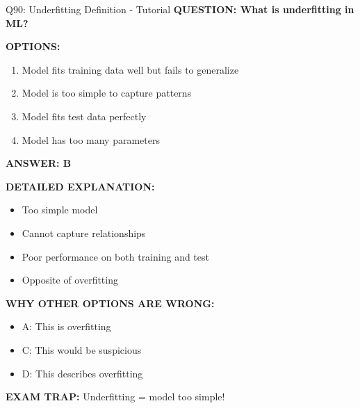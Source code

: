 \documentclass[8pt]{beamer}
\begin{document}
	\begin{frame}{Q90: Underfitting Definition - Tutorial}
		\fontsize{6.5}{7.5}\selectfont
		\textbf{QUESTION: What is underfitting in ML?}
		
		\vspace{0.1cm}
		\textbf{OPTIONS:}
		\begin{enumerate}
			\item Model fits training data well but fails to generalize
			\item Model is too simple to capture patterns
			\item Model fits test data perfectly
			\item Model has too many parameters
		\end{enumerate}
		
		\vspace{0.1cm}
		\textcolor{myblue}{\textbf{ANSWER: B}}
		
		\vspace{0.1cm}
		\textbf{DETAILED EXPLANATION:}
		\begin{itemize}
			\item Too simple model
			\item Cannot capture relationships
			\item Poor performance on both training and test
			\item Opposite of overfitting
		\end{itemize}
		
		\vspace{0.1cm}
		\textcolor{myred}{\textbf{WHY OTHER OPTIONS ARE WRONG:}}
		\begin{itemize}
			\item \textcolor{myred}{A:} This is overfitting
			\item \textcolor{myred}{C:} This would be suspicious
			\item \textcolor{myred}{D:} This describes overfitting
		\end{itemize}
		
		\textcolor{myred}{\textbf{EXAM TRAP:}} Underfitting = \textcolor{myblue}{model too simple}!
	\end{frame}
	
\end{document}
